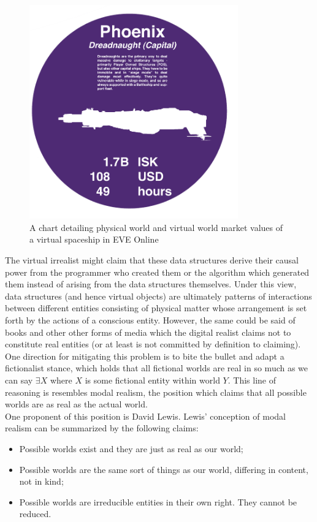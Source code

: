  \begin{figure}[ht!]
 	\centering
 	\includegraphics[width=90mm]{4339410221_12d667f5b1_o.png}
 	\caption{A chart detailing physical world and virtual world market values of a virtual spaceship in EVE Online \label{EVEOnline}}
 \end{figure}
 
 The virtual irrealist might claim that these data structures derive their causal power from the programmer who created them or the algorithm which generated them instead of arising from the data structures themselves. Under this view, data structures (and hence virtual objects) are ultimately patterns of interactions between different entities consisting of physical matter whose arrangement is set forth by the actions of a conscious entity. However, the same could be said of books and other other forms of media which the digital realist claims not to constitute real entities (or at least is not committed by definition to claiming). One direction for mitigating this problem is to bite the bullet and adapt a fictionalist stance, which holds that all fictional worlds are real in so much as we can say $\exists X$ where $X$ is some fictional entity within world $Y$. This line of reasoning is resembles modal realism, the position which claims that all possible worlds are as real as the actual world.\cite{lewis1986on} 
 \\
 
 
 One proponent of this position is David Lewis. Lewis' conception of modal realism can be summarized by the following claims:
 \begin{itemize}
 	\item Possible worlds exist and they are just as real as our world;
 	
 	\item Possible worlds are the same sort of things as our world,  differing in content, not in kind;
 	\item Possible worlds are irreducible entities in their own right. They cannot be reduced.  \cite{lewis2001counterfactuals} 
 \end{itemize}

